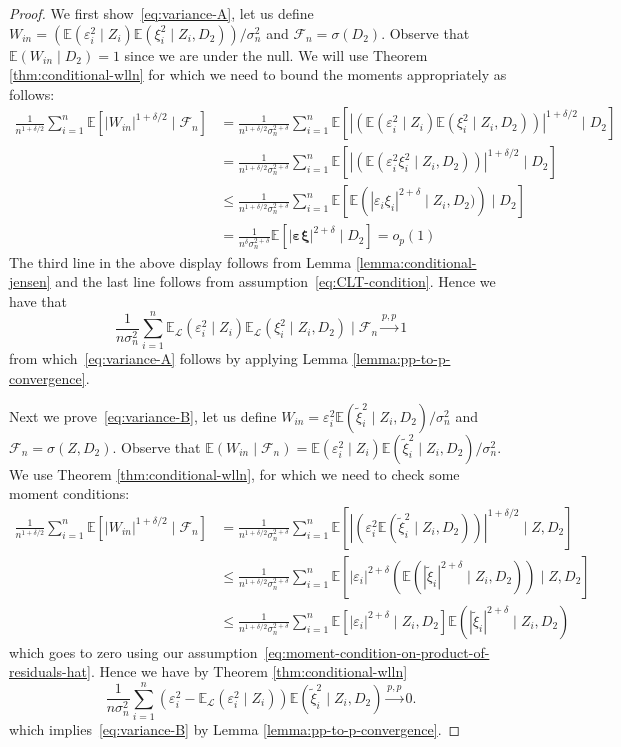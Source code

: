 \documentclass[12pt]{article}
\theoremstyle{definition}
\theoremstyle{remark}
\newcommand{\E}{\mathbb E}								%
\newcommand{\cF}{\mathcal F}						%
\newcommand{\srz}{Z}									%
\newcommand{\law}{\mathcal L}							%
\begin{document}
\begin{proof}
	We first show~\eqref{eq:variance-A}, let us define $W_{in} = \left(\E(\varepsilon_i^2 \mid \srz_i) \E(\xi_i^2 \mid \srz_i,D_2) \right)/\sigma_n^2$ and $\cF_n = \sigma(D_2)$. Observe that $\E(W_{in} \mid D_2) = 1$ since we are under the null. We will use Theorem \ref{thm:conditional-wlln} for which we need to bound the moments appropriately as follows:
	\begin{align*}
		\frac{1}{n^{1 + \delta/2}} \sum_{i=1}^n \E[|W_{in}|^{1+\delta/2} \mid \cF_n] &= \frac{1}{n^{1+\delta/2}\sigma_n^{2+\delta}}\sum_{i=1}^n  \E[| \left(\E(\varepsilon_i^2 \mid \srz_i) \E(\xi_i^2 \mid \srz_i,D_2) \right)|^{1+\delta/2} \mid D_2]\\
		&= \frac{1}{n^{1+\delta/2}\sigma_n^{2+\delta}}\sum_{i=1}^n  \E[| \left(\E(\varepsilon_i^2 \xi_i^2 \mid \srz_i,D_2) \right)|^{1+\delta/2} \mid D_2]\\
		&\leq \frac{1}{n^{1+\delta/2}\sigma_n^{2+\delta}}\sum_{i=1}^n  \E[ \E\left(|\varepsilon_i \xi_i|^{2+\delta} \mid \srz_i,D_2) \right) \mid D_2]\\
		&= \frac{1}{n^\delta \sigma_n^{2+\delta}}\E[|\bm\varepsilon\bm \xi|^{2+\delta}\mid D_2] = o_p(1)
	\end{align*}
	The third line in the above display follows from Lemma \ref{lemma:conditional-jensen} and the last line follows from assumption~\eqref{eq:CLT-condition}. Hence we have that
	$$
	\frac{1}{n\sigma_n^2} \sum_{i=1}^n \E_\law(\varepsilon^2_i \mid \srz_i) \E_\law(\xi_i^2 \mid \srz_i, D_2) \mid \cF_n \overset{p,p}{\to} 1 
	$$
	from which~\eqref{eq:variance-A} follows by applying Lemma \ref{lemma:pp-to-p-convergence}.
	
	Next we prove~\eqref{eq:variance-B}, let us define $W_{in} = \varepsilon_i^2 \E(\widetilde \xi_i^2 \mid \srz_i,D_2)/\sigma_n^2$ and $\cF_n = \sigma(\srz,D_2)$. Observe that $\E(W_{in} \mid \cF_n) = \E(\varepsilon_i^2 \mid \srz_i)\E(\widetilde \xi_i^2 \mid \srz_i,D_2) /\sigma_n^2$. We use Theorem \ref{thm:conditional-wlln}, for which we need to check some moment conditions:
	\begin{align*}
		\frac{1}{n^{1 + \delta/2}} \sum_{i=1}^n \E[|W_{in}|^{1+\delta/2} \mid \cF_n] &= \frac{1}{n^{1+\delta/2}\sigma_n^{2+\delta}}\sum_{i=1}^n  \E\left[\left| \left(\varepsilon_i^2  \E(\widetilde\xi_i^2 \mid \srz_i,D_2) \right)\right|^{1+\delta/2} \mid \srz, D_2\right]\\
		&\leq \frac{1}{n^{1+\delta/2}\sigma_n^{2+\delta}}\sum_{i=1}^n  \E\left[ |\varepsilon_i|^{2 + \delta} \left(  \E(|\widetilde\xi_i|^{2+\delta} \mid \srz_i,D_2) \right) \mid \srz, D_2\right]\\
		&\leq \frac{1}{n^{1+\delta/2}\sigma_n^{2+\delta}}\sum_{i=1}^n  \E\left[ |\varepsilon_i|^{2 + \delta}  \mid \srz_i, D_2\right] \E(|\widetilde\xi_i|^{2+\delta} \mid \srz_i,D_2)
	\end{align*}
	which goes to zero using our assumption~\eqref{eq:moment-condition-on-product-of-residuals-hat}. Hence we have by Theorem \ref{thm:conditional-wlln}
	$$
	\frac{1}{n\sigma_n^2} \sum_{i=1}^n \left(\varepsilon_i^2 - \E_\law(\varepsilon_i^2 \mid \srz_i) \right)\E(\widetilde\xi_i^2 \mid \srz_i,D_2) \overset{p,p}{\to} 0.
	$$
	which implies~\eqref{eq:variance-B} by Lemma \ref{lemma:pp-to-p-convergence}.
	

\end{proof}
\end{document}
